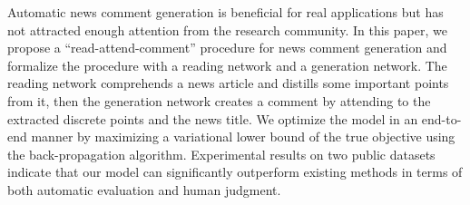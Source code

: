 Automatic news comment generation is beneficial for real applications but has not attracted enough attention from the research community. In this paper, we propose a ``read-attend-comment'' procedure for news comment generation and formalize the procedure with a reading network and a generation network. The reading network comprehends a news article and distills some important points from it, then the generation network creates a comment by attending to the extracted discrete points and the news title. We optimize the model in an end-to-end manner by maximizing a variational lower bound of the true objective using the back-propagation algorithm. Experimental results on two public datasets indicate that our model can significantly outperform existing methods in terms of both automatic evaluation and human judgment.